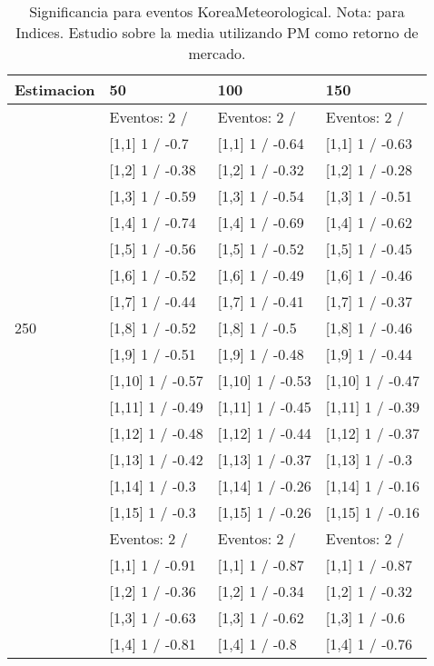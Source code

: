 \begin{table}

\caption{Significancia para eventos KoreaMeteorological. Nota: para Indices. Estudio sobre la media utilizando PM como retorno de mercado.}
\centering
\begin{tabular}[t]{llll}
\toprule
Estimacion & 50 & 100 & 150\\
\midrule
 & Eventos:  2 / & Eventos:  2 / & Eventos:  2 /\\
 & {}[1,1] 1  / -0.7 & {}[1,1] 1  / -0.64 & {}[1,1] 1  / -0.63\\
 & {}[1,2] 1  / -0.38 & {}[1,2] 1  / -0.32 & {}[1,2] 1  / -0.28\\
 & {}[1,3] 1  / -0.59 & {}[1,3] 1  / -0.54 & {}[1,3] 1  / -0.51\\
 & {}[1,4] 1  / -0.74 & {}[1,4] 1  / -0.69 & {}[1,4] 1  / -0.62\\
\addlinespace
 & {}[1,5] 1  / -0.56 & {}[1,5] 1  / -0.52 & {}[1,5] 1  / -0.45\\
 & {}[1,6] 1  / -0.52 & {}[1,6] 1  / -0.49 & {}[1,6] 1  / -0.46\\
 & {}[1,7] 1  / -0.44 & {}[1,7] 1  / -0.41 & {}[1,7] 1  / -0.37\\
250 & {}[1,8] 1  / -0.52 & {}[1,8] 1  / -0.5 & {}[1,8] 1  / -0.46\\
 & {}[1,9] 1  / -0.51 & {}[1,9] 1  / -0.48 & {}[1,9] 1  / -0.44\\
\addlinespace
 & {}[1,10] 1  / -0.57 & {}[1,10] 1  / -0.53 & {}[1,10] 1  / -0.47\\
 & {}[1,11] 1  / -0.49 & {}[1,11] 1  / -0.45 & {}[1,11] 1  / -0.39\\
 & {}[1,12] 1  / -0.48 & {}[1,12] 1  / -0.44 & {}[1,12] 1  / -0.37\\
 & {}[1,13] 1  / -0.42 & {}[1,13] 1  / -0.37 & {}[1,13] 1  / -0.3\\
 & {}[1,14] 1  / -0.3 & {}[1,14] 1  / -0.26 & {}[1,14] 1  / -0.16\\
\addlinespace
 & {}[1,15] 1  / -0.3 & {}[1,15] 1  / -0.26 & {}[1,15] 1  / -0.16\\
 & Eventos:  2 / & Eventos:  2 / & Eventos:  2 /\\
 & {}[1,1] 1  / -0.91 & {}[1,1] 1  / -0.87 & {}[1,1] 1  / -0.87\\
 & {}[1,2] 1  / -0.36 & {}[1,2] 1  / -0.34 & {}[1,2] 1  / -0.32\\
 & {}[1,3] 1  / -0.63 & {}[1,3] 1  / -0.62 & {}[1,3] 1  / -0.6\\
\addlinespace
 & {}[1,4] 1  / -0.81 & {}[1,4] 1  / -0.8 & {}[1,4] 1  / -0.76\\

\end{tabular}
\end{table}
